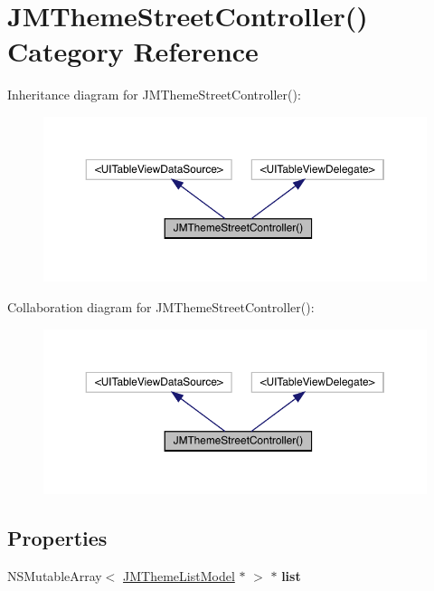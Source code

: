\hypertarget{category_j_m_theme_street_controller_07_08}{}\section{J\+M\+Theme\+Street\+Controller() Category Reference}
\label{category_j_m_theme_street_controller_07_08}


Inheritance diagram for J\+M\+Theme\+Street\+Controller()\+:\nopagebreak
\begin{figure}[H]
\begin{center}
\leavevmode
\includegraphics[width=350pt]{category_j_m_theme_street_controller_07_08__inherit__graph}
\end{center}
\end{figure}


Collaboration diagram for J\+M\+Theme\+Street\+Controller()\+:\nopagebreak
\begin{figure}[H]
\begin{center}
\leavevmode
\includegraphics[width=350pt]{category_j_m_theme_street_controller_07_08__coll__graph}
\end{center}
\end{figure}
\subsection*{Properties}
\begin{DoxyCompactItemize}
\item 
\mbox{\label{category_j_m_theme_street_controller_07_08_aa3decfc2769024799367f1080861eb6b}} 
N\+S\+Mutable\+Array$<$ \mbox{\hyperlink{interface_j_m_theme_list_model}{J\+M\+Theme\+List\+Model}} $\ast$ $>$ $\ast$ {\bfseries list}
\end{DoxyCompactItemize}


